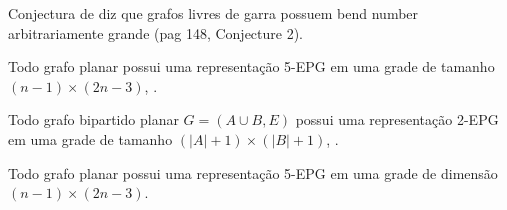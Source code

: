 Conjectura de \cite{heldt2014} diz que grafos livres de garra possuem bend number arbitrariamente grande (pag 148, Conjecture 2).

\begin{theorem}
Todo grafo planar possui uma representação 5-EPG em uma grade de tamanho $(n-1)\times(2n-3)$, \cite{biedl2010}.
\end{theorem}

\begin{theorem}
Todo grafo bipartido planar $G=(A\cup B, E)$ possui uma representação 2-EPG em uma grade de tamanho $(|A|+1)\times(|B|+1)$, \cite{biedl2010}.
\end{theorem}






\begin{theorem}
Todo grafo planar possui uma representação 5-EPG em uma grade de dimensão $(n-1)\times(2n-3)$\cite{biedl2010}.
\end{theorem}




